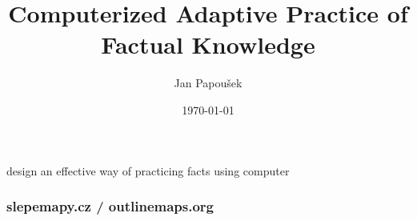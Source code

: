 \documentclass[xcolor=svgnames]{beamer}
\title{Computerized Adaptive Practice of Factual Knowledge}
\author{Jan Papou\v{s}ek}
\institute{Masaryk University Brno}
\date{\today}
\begin{document}
\frame[plain]{\titlepage}
\begin{frame}
	\begin{center}
	\huge design an effective way of practicing facts using computer
	\end{center}
\end{frame}
\begin{frame}
	\frametitle{slepemapy.cz / outlinemaps.org}
	\begin{center}
	\end{center}
\end{frame}
\end{document}
